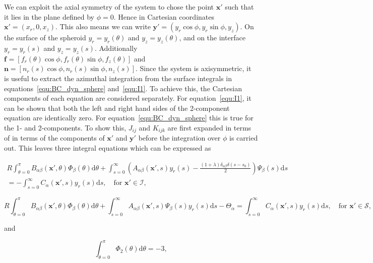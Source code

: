 \documentclass[12pt]{article}
\begin{document}
We can exploit the axial symmetry of the system to chose the point $\boldsymbol{x'}$ such that it lies in the plane defined by $\phi = 0$. Hence in Cartesian coordinates $\boldsymbol{x'} = (x_{r}, 0, x_{z})$. This also means we can write $\boldsymbol{y'} = (y_{r} \cos \phi, y_{r} \sin \phi, y_{z})$. On the surface of the spheroid $y_{r} = y_{r}(\theta)$ and $y_{z} = y_{z}(\theta)$, and on the interface $y_{r} = y_{r}(s)$ and $y_{z} = y_{z}(s)$. Additionally $\boldsymbol{f}_{} = [f_{r}(\theta) \cos \phi, f_{r}(\theta) \sin \phi, f_{z}(\theta)]$ and $\boldsymbol{n} = [n_{r}(s) \cos\phi, n_{r}(s) \sin\phi, n_{z}(s)]$. Since the system is axisymmetric, it is useful to extract the azimuthal integration from the surface integrals in equations~\ref{equ:BC_dyn_sphere} and~\ref{equ:I1}. To achieve this, the Cartesian components of each equation are considered separately. For equation~\ref{equ:I1}, it can be shown that both the left and right hand sides of the 2-component equation are identically zero. For equation~\ref{equ:BC_dyn_sphere} this is true for the 1- and 2-components. To show this, $J_{ij}$ and $K_{ijk}$ are first expanded in terms of in terms of the components of $\boldsymbol{x'}$ and $\boldsymbol{y'}$ before the integration over $\phi$ is carried out. This leaves three integral equations which can be expressed as

\begin{align}
\label{equ:cont_ie_1}
R \int_{\theta = 0}^{\pi} B_{\alpha\beta}(\boldsymbol{x'},\theta) \Phi_{\beta}(\theta) \mathrm{d}\theta + \int_{s = 0}^{\infty} \left(A_{\alpha\beta}(\boldsymbol{x'},s) y_{r}(s) - \frac{(1 + \lambda)\delta_{\alpha\beta} \delta(s - s_{0})}{2}\right) \Psi_{\beta}(s) \mathrm{d}s \nonumber \\
= - \int_{s = 0}^{\infty} C_{\alpha}(\boldsymbol{x'},s) y_{r}(s) \mathrm{d}s, \quad \text{for } \boldsymbol{x'} \in \mathcal{I},
\end{align}

\begin{equation}
\label{equ:cont_ie_2}
R \int_{\theta = 0}^{\pi} B_{\alpha\beta}(\boldsymbol{x'},\theta) \Phi_{\beta}(\theta) \mathrm{d}\theta + \int_{s = 0}^{\infty} A_{\alpha\beta}(\boldsymbol{x'},s) \Psi_{\beta}(s) y_{r}(s) \mathrm{d}s - \Theta_{\alpha} = \int_{s = 0}^{\infty} C_{\alpha}(\boldsymbol{x'},s) y_{r}(s) \mathrm{d}s, \quad \text{for } \boldsymbol{x'} \in \mathcal{S}, 
\end{equation}

and 

\begin{equation}
\label{equ:cont_ie_3}
\int_{\theta = 0}^{\pi} \Phi_{2}(\theta) \mathrm{d}\theta = -3, 
\end{equation}
\end{document}

